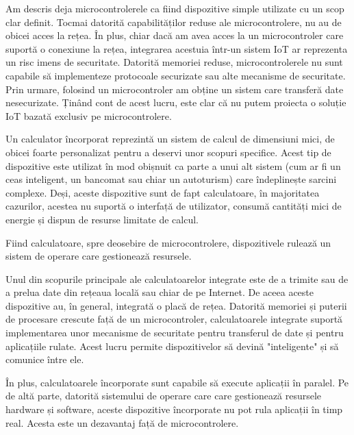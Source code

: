 Am descris deja microcontrolerele ca fiind dispozitive simple utilizate cu un
scop clar definit. Tocmai datorită capabilităților reduse ale microcontrolere,
nu au de obicei acces la rețea. În plus, chiar dacă am avea acces la un
microcontroler care suportă o conexiune la rețea, integrarea acestuia într-un
sistem IoT ar reprezenta un risc imens de securitate. Datorită memoriei reduse,
microcontrolerele nu sunt capabile să implementeze protocoale securizate sau
alte mecanisme de securitate. Prin urmare, folosind un microcontroler am obține
un sistem care transferă date nesecurizate. Ținând cont de acest lucru, este
clar că nu putem proiecta o soluție IoT bazată exclusiv pe microcontrolere.

Un calculator încorporat reprezintă un sistem de calcul de dimensiuni mici, de
obicei foarte personalizat pentru a deservi unor scopuri specifice. Acest tip de
dispozitive este utilizat în mod obișnuit ca parte a unui alt sistem (cum ar fi
un ceas inteligent, un bancomat sau chiar un autoturism) care îndeplinește
sarcini complexe. Deși, aceste dispozitive sunt de fapt calculatoare, în
majoritatea cazurilor, acestea nu suportă o interfață de utilizator, consumă
cantități mici de energie și dispun de resurse limitate de calcul.

Fiind calculatoare, spre deosebire de microcontrolere, dispozitivele rulează un
sistem de operare care gestionează resursele.

Unul din scopurile principale ale calculatoarelor integrate este de a trimite
sau de a prelua date din rețeaua locală sau chiar de pe Internet. De aceea
aceste dispozitive au, în general, integrată o placă de rețea. Datorită memoriei
și puterii de procesare crescute față de un microcontroler, calculatoarele
integrate suportă implementarea unor mecanisme de securitate pentru transferul
de date și pentru aplicațiile rulate. Acest lucru permite dispozitivelor să
devină "inteligente" și să comunice între ele.

În plus, calculatoarele încorporate sunt capabile să execute aplicații în
paralel. Pe de altă parte, datorită sistemului de operare care care gestionează
resursele hardware și software, aceste dispozitive încorporate nu pot rula
aplicații în timp real. Acesta este un dezavantaj față de microcontrolere.

